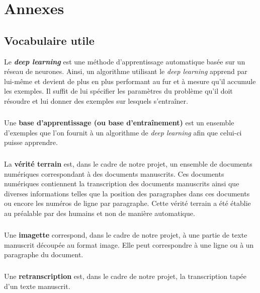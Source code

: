\chapter{Annexes}

\section*{Vocabulaire utile}

Le \textbf{\textit{deep learning}} est une méthode d’apprentissage automatique
basée sur un réseau de neurones. Ainsi, un algorithme utilisant le \textit{deep
learning} apprend par lui-même et devient de plus en plus performant au fur et
à mesure qu’il accumule les exemples. Il suffit de lui spécifier les paramètres
du problème qu’il doit résoudre et lui donner des exemples sur lesquels
s’entraîner. 

\paragraph{}
Une \textbf{base d’apprentissage (ou base d'entraînement)} est un ensemble
d’exemples que l’on fournit à un algorithme de \textit{deep learning} afin que
celui-ci puisse apprendre.

\paragraph{}
La \textbf{vérité terrain} est, dans le cadre de notre projet, un ensemble de
documents numériques correspondant à des documents manuscrits. Ces documents
numériques contiennent la transcription des documents manuscrits ainsi que
diverses informations telles que la position des paragraphes dans ces documents
ou encore les numéros de ligne par paragraphe. Cette vérité terrain a été
établie au préalable par des humains et non de manière automatique.

\paragraph{}
Une \textbf{imagette} correspond, dans le cadre de notre projet, à une partie
de texte manuscrit découpée au format image. Elle peut correspondre à une ligne
ou à un paragraphe du document.

\paragraph{}
Une \textbf{retranscription} est, dans le cadre de notre projet, la
transcription tapée d’un texte manuscrit.

